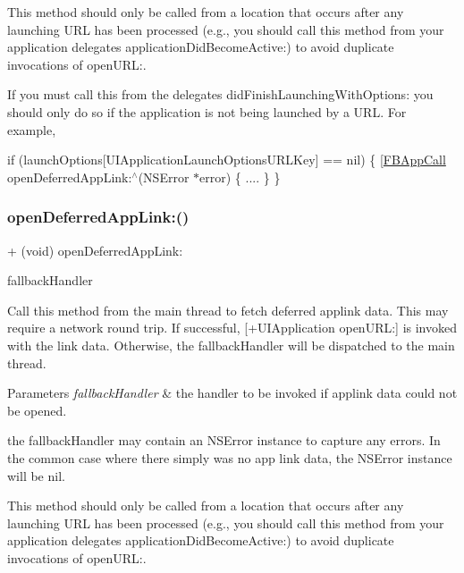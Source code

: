 This method should only be called from a location that occurs after any launching U\+RL has been processed (e.\+g., you should call this method from your application delegate\textquotesingle{}s application\+Did\+Become\+Active\+:) to avoid duplicate invocations of open\+U\+RL\+:.

If you must call this from the delegate\textquotesingle{}s did\+Finish\+Launching\+With\+Options\+: you should only do so if the application is not being launched by a U\+RL. For example,

if (launch\+Options\mbox{[}U\+I\+Application\+Launch\+Options\+U\+R\+L\+Key\mbox{]} == nil) \{ \mbox{[}\hyperlink{interfaceFBAppCall}{F\+B\+App\+Call} open\+Deferred\+App\+Link\+:$^\wedge$(N\+S\+Error $\ast$error) \{ .... \} \} \mbox{\label{interfaceFBAppCall_a02498c71e0be169b1ae49136d1446a23}} 
\subsubsection{\texorpdfstring{open\+Deferred\+App\+Link\+:()}{openDeferredAppLink:()}\hspace{0.1cm}{\footnotesize\ttfamily [3/5]}}
{\footnotesize\ttfamily + (void) open\+Deferred\+App\+Link\+: \begin{DoxyParamCaption}\item[{(F\+B\+App\+Link\+Fallback\+Handler)}]{fallback\+Handler }\end{DoxyParamCaption}}

Call this method from the main thread to fetch deferred applink data. This may require a network round trip. If successful, \mbox{[}+\+U\+I\+Application open\+U\+RL\+:\mbox{]} is invoked with the link data. Otherwise, the fallback\+Handler will be dispatched to the main thread.


\begin{DoxyParams}{Parameters}
{\em fallback\+Handler} & the handler to be invoked if applink data could not be opened.\\
\hline
\end{DoxyParams}
the fallback\+Handler may contain an N\+S\+Error instance to capture any errors. In the common case where there simply was no app link data, the N\+S\+Error instance will be nil.

This method should only be called from a location that occurs after any launching U\+RL has been processed (e.\+g., you should call this method from your application delegate\textquotesingle{}s application\+Did\+Become\+Active\+:) to avoid duplicate invocations of open\+U\+RL\+:.

